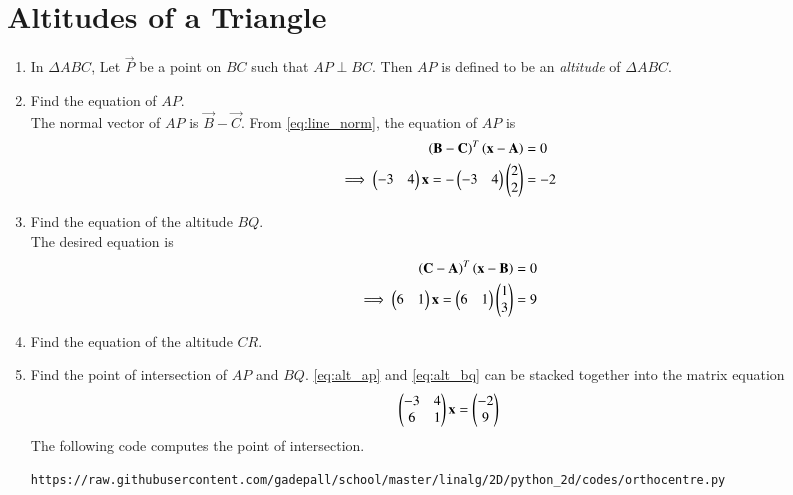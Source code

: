 \documentclass[journal,12pt,twocolumn]{IEEEtran}
\renewcommand\thesection{\arabic{section}}
\begin{document}
\section{Altitudes of a Triangle}
\begin{enumerate}[label=\thesection.\arabic*
,ref=\thesection.\theenumi]
\item
In $\Delta ABC$,  Let $\vec{P}$ be a point on $BC$ such that $AP \perp BC$.  Then $AP$ is defined to be 
an {\em altitude} of $\Delta ABC$.

\item
\label{prob:alt_eq}
Find the equation of $AP$.
\\
\solution The normal vector of $AP$ is $\vec{B} - \vec{C}$. From 
\eqref{eq:line_norm}, the equation of $AP$ is
\begin{align}
\label{eq:alt_ap}
\left(\mathbf{B} - \mathbf{C}\right)^T\left(\mathbf{x} - \mathbf{A}\right)&= 0
\\
\implies \begin{pmatrix}-3&4\end{pmatrix}\mathbf{x} = -\begin{pmatrix}-3&4\end{pmatrix}\begin{pmatrix}2\\2\end{pmatrix} &= -2
\end{align}

%
%
\item Find the equation of the altitude $BQ$.
\\
\solution The desired equation is 
\begin{align}
\label{eq:alt_bq}
\left(\mathbf{C} - \mathbf{A}\right)^T\left(\mathbf{x} - \mathbf{B}\right)&= 0
\\
\implies \begin{pmatrix}6&1\end{pmatrix}\mathbf{x} = \begin{pmatrix}6&1\end{pmatrix}\begin{pmatrix}1\\3\end{pmatrix} &= 9
\end{align}
\item Find the equation of the altitude $CR$.
%
\item Find the point of intersection of $AP$ and $BQ$.
\solution \eqref{eq:alt_ap} and \eqref{eq:alt_bq} can be stacked together into the matrix equation
\begin{align}
\label{eq:alt_mat}
 \begin{pmatrix}-3&4 \\ 6&1\end{pmatrix}\mathbf{x} = \begin{pmatrix}-2\\9\end{pmatrix}
\end{align}
The following code computes the point of intersection.
\begin{lstlisting}
https://raw.githubusercontent.com/gadepall/school/master/linalg/2D/python_2d/codes/orthocentre.py
\end{lstlisting}


\end{enumerate}
\end{document}
